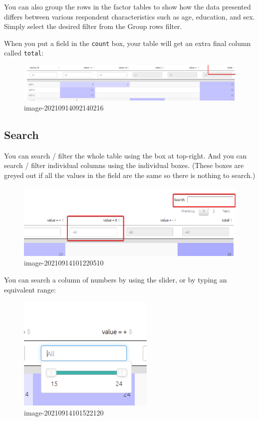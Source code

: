\documentclass[
]{book}
\begin{document}
You can also group the rows in the factor tables to show how the data presented differs between various respondent characteristics such as age, education, and sex. Simply select the desired filter from the Group rows filter.

When you put a field in the \texttt{count} box, your table will get an extra final column called \texttt{total}:

\begin{figure}
\centering
\includegraphics[width=6.77083in,height=\textheight]{_assets/image-20210914092140216.png}
\caption{image-20210914092140216}
\end{figure}

\hypertarget{search}{%
\subsection{Search}\label{search}}

You can search / filter the whole table using the box at top-right. And you can search / filter individual columns using the individual boxes. (These boxes are greyed out if all the values in the field are the same so there is nothing to search.)

\begin{figure}
\centering
\includegraphics[width=6.77083in,height=\textheight]{_assets/image-20210914101220510.png}
\caption{image-20210914101220510}
\end{figure}

You can search a column of numbers by using the slider, or by typing an equivalent range:

\begin{figure}
\centering
\includegraphics{_assets/image-20210914101522120.png}
\caption{image-20210914101522120}
\end{figure}
\end{document}
